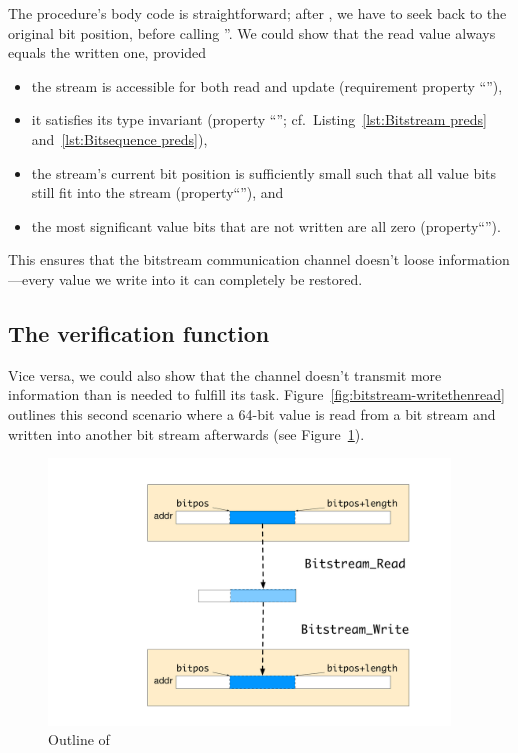 The procedure's body code is straightforward; after
, we have to seek back to the original bit
position, before calling ''.
%
We could show that the read value always equals the written one,
provided
\begin{itemize}
\item the stream is accessible for both read and update
	(requirement property ``''),
\item it satisfies its type invariant (property
	``''; cf.\ Listing~\ref{lst:Bitstream preds}
	and~\ref{lst:Bitsequence preds}),
\item the stream's current bit position is sufficiently small such that
	all value bits still fit into the stream
	(property``''), and
\item the most significant value bits that are not written are all zero
	(property``'').
\end{itemize}
%
This ensures that the bitstream communication channel doesn't loose
information---every value we write into it can completely be
restored.


\subsection{The verification function }

Vice versa, we could also show that the channel doesn't transmit more
information than is needed to fulfill its task.
Figure~\ref{fig:bitstream-writethenread} outlines this second scenario
where a 64-bit value is read from a bit stream and written into another bit stream
afterwards (see Figure~\ref{fig:bitstream-readthenwrite}).

\begin{figure}[hbt]
\begin{center}
\includegraphics[width=0.95\textwidth]{figures/bitstream-readthenwrite.pdf}
\caption{\label{fig:bitstream-readthenwrite}
        Outline of }
\end{center}
\end{figure}


